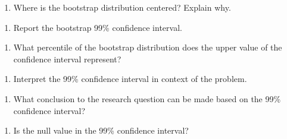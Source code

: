 \documentclass[
]{report}
\providecommand{\tightlist}{%
  \setlength{\itemsep}{0pt}\setlength{\parskip}{0pt}}
\begin{document}
\newpage

\begin{enumerate}
\def\labelenumi{\arabic{enumi}.}
\setcounter{enumi}{7}
\tightlist
\item
  Where is the bootstrap distribution centered? Explain why.
\end{enumerate}

\vspace{0.8in}

\begin{enumerate}
\def\labelenumi{\arabic{enumi}.}
\setcounter{enumi}{8}
\tightlist
\item
  Report the bootstrap 99\% confidence interval.
\end{enumerate}

\vspace{0.4in}

\begin{enumerate}
\def\labelenumi{\arabic{enumi}.}
\setcounter{enumi}{9}
\tightlist
\item
  What percentile of the bootstrap distribution does the upper value of the confidence interval represent?
\end{enumerate}

\vspace{0.3in}

\begin{enumerate}
\def\labelenumi{\arabic{enumi}.}
\setcounter{enumi}{10}
\tightlist
\item
  Interpret the 99\% confidence interval in context of the problem.
\end{enumerate}

\vspace{1in}

\begin{enumerate}
\def\labelenumi{\arabic{enumi}.}
\setcounter{enumi}{11}
\tightlist
\item
  What conclusion to the research question can be made based on the 99\% confidence interval?
\end{enumerate}

\vspace{0.8in}

\begin{enumerate}
\def\labelenumi{\arabic{enumi}.}
\setcounter{enumi}{12}
\tightlist
\item
  Is the null value in the 99\% confidence interval?
\end{enumerate}

\vspace{0.8in}
\end{document}
